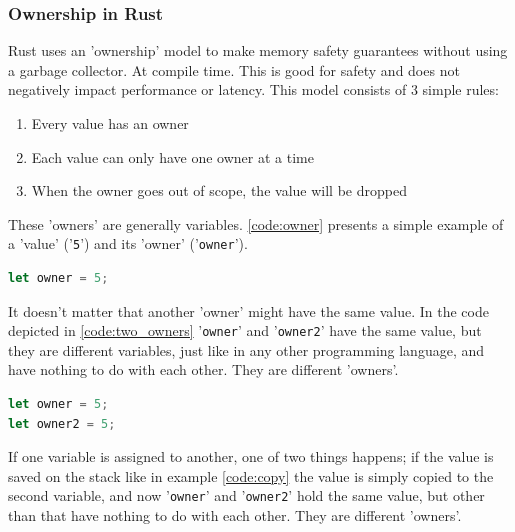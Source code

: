 \subsubsection{Ownership in Rust}

Rust uses an 'ownership' model \cite{rust_ownership} to make memory safety guarantees without using a garbage collector. At compile time.
This is good for safety and does not negatively impact performance or latency.
This model consists of 3 simple rules:
\begin{enumerate}
    \item Every value has an owner
    \item Each value can only have one owner at a time
    \item When the owner goes out of scope, the value will be dropped
\end{enumerate}

These 'owners' are generally variables. \ref{code:owner} presents a simple example of a 'value' ('\lstinline{5}') and its
'owner' ('\lstinline{owner}').\\

\begin{minipage}{\textwidth}
\begin{lstlisting}[style=colorEX,language=Rust,caption={Simple example of a value and it's owner},label={code:owner}]
let owner = 5;
\end{lstlisting}
\end{minipage}

It doesn't matter that another 'owner' might have the same value. In the code depicted in \ref{code:two_owners}
'\lstinline{owner}' and '\lstinline{owner2}' have the same value, but they are different variables, just like in any
other programming language, and have nothing to do with each other. They are different 'owners'.\\

\begin{minipage}{\textwidth}
\begin{lstlisting}[style=colorEX,language=Rust,caption={Simple example of two owners},label={code:two_owners}]
let owner = 5;
let owner2 = 5;
\end{lstlisting}
\end{minipage}


If one variable is assigned to another, one of two things happens; if the value is saved on the stack like in
example \ref{code:copy} the value is simply copied to the second variable, and now '\lstinline{owner}' and '\lstinline{owner2}'
hold the same value, but other than that have nothing to do with each other. They are different 'owners'.\\

